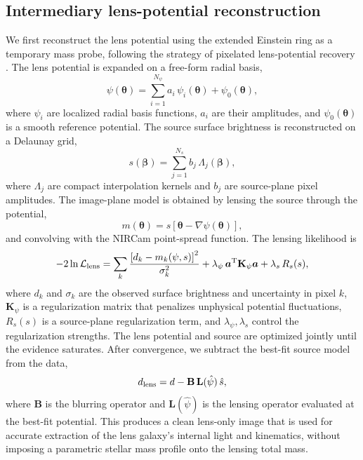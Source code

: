 \documentclass{article}
\begin{document}
\subsection{Intermediary lens-potential reconstruction}
We first reconstruct the lens potential using the extended Einstein ring as a temporary mass probe, following the strategy of pixelated lens-potential recovery \cite{Suyu2006, Warren2003}. The lens potential is expanded on a free-form radial basis,
\begin{equation}
\psi(\boldsymbol{\theta}) = \sum_{i=1}^{N_{\psi}} a_i\, \psi_i(\boldsymbol{\theta}) + \psi_0(\boldsymbol{\theta}),
\label{eq:lens_potential}
\end{equation}
where \(\psi_i\) are localized radial basis functions, \(a_i\) are their amplitudes, and \(\psi_0(\boldsymbol{\theta})\) is a smooth reference potential. The source surface brightness is reconstructed on a Delaunay grid,
\begin{equation}
s(\boldsymbol{\beta}) = \sum_{j=1}^{N_s} b_j\, \Lambda_j(\boldsymbol{\beta}),
\label{eq:source_grid}
\end{equation}
where \(\Lambda_j\) are compact interpolation kernels and \(b_j\) are source-plane pixel amplitudes. The image-plane model is obtained by lensing the source through the potential,
\begin{equation}
m(\boldsymbol{\theta}) = s\!\left[\boldsymbol{\theta} - \nabla \psi(\boldsymbol{\theta})\right],
\label{eq:lens_equation}
\end{equation}
and convolving with the NIRCam point-spread function. The lensing likelihood is
\begin{equation}
-2\ln \mathcal{L}_{\rm lens} =
\sum_{k} \frac{\left[d_k - m_k(\psi,s)\right]^2}{\sigma_k^2}
+ \lambda_{\psi}\, \boldsymbol{a}^{\rm T} \mathbf{K}_{\psi} \boldsymbol{a}
+ \lambda_{s}\, R_s(s),
\label{eq:lens_likelihood}
\end{equation}
where \(d_k\) and \(\sigma_k\) are the observed surface brightness and uncertainty in pixel \(k\), \(\mathbf{K}_{\psi}\) is a regularization matrix that penalizes unphysical potential fluctuations, \(R_s(s)\) is a source-plane regularization term, and \(\lambda_{\psi}, \lambda_s\) control the regularization strengths. The lens potential and source are optimized jointly until the evidence saturates. After convergence, we subtract the best-fit source model from the data,
\begin{equation}
d_{\rm lens} = d - \mathbf{B}\,\mathbf{L}(\hat\psi)\,\hat{s},
\label{eq:clean_lens}
\end{equation}
where \(\mathbf{B}\) is the blurring operator and \(\mathbf{L}(\hat\psi)\) is the lensing operator evaluated at the best-fit potential. This produces a clean lens-only image that is used for accurate extraction of the lens galaxy's internal light and kinematics, without imposing a parametric stellar mass profile onto the lensing total mass.
\end{document}
